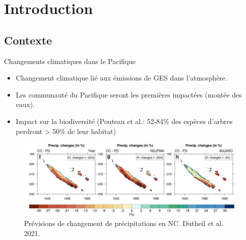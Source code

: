 \documentclass[10pt,table,dvipsnames,compress]{beamer}
\begin{document}
\section{Introduction}
\label{sec:orgbac7b38}

\subsection{Contexte}
\label{sec:orgfefc841}

\begin{frame}[label={sec:org7bfa81a}]{Changements climatiques dans le Pacifique}
\begin{itemize}
\item Changement climatique lié aux émissions de GES dans l'atmosphère.
\item Les communauté du Pacifique seront les premières impactées (montée des eaux).
\item Impact sur la biodiversité (Pouteau et al.: 52-84\% des espèces d'arbres perdront > 50\% de leur habitat)
\end{itemize}

\begin{figure}[htbp]
\centering
\includegraphics[width=\textwidth]{figs/Dutheil2021_cc.jpg}
\caption{Prévisions de changement de précipitations en NC. Dutheil et al. 2021.}
\end{figure}
\end{frame}
\end{document}
